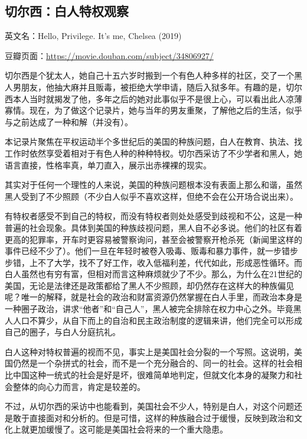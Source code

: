 \subsection{切尔西：白人特权观察}

英文名：Hello, Privilege. It's me, Chelsea (2019)

豆瓣页面：\url{https://movie.douban.com/subject/34806927/}

切尔西是个犹太人，她自己十五六岁时搬到一个有色人种多样的社区，交了一个黑人男朋友，他抽大麻并且贩毒，被拒绝大学申请，随后入狱多年。有趣的是，切尔西本人当时就揭发了他，多年之后的她对此事似乎不是很上心，可以看出此人凉薄寡情。现在，为了做这个记录片，她与当年的男友重聚，了解他之后的生活，似乎与之前达成了一种和解（并没有）。

本记录片聚焦在平权运动半个多世纪后的美国的种族问题，白人在教育、执法、找工作时依然享受着相对于有色人种的种种特权。切尔西采访了不少学者和黑人，她语言直接，性格率真，单刀直入，展示出赤裸裸的现实。

其实对于任何一个理性的人来说，美国的种族问题根本没有表面上那么和谐，虽然黑人受到了不少照顾（不少白人似乎不喜欢这样，但绝不会在公开场合说出来）。

有特权者感受不到自己的特权，而没有特权者则处处感受到歧视和不公，这是一种普遍的社会现象。具体到美国的种族歧视问题，黑人自不必多说。他们的社区有着更高的犯罪率，开车时更容易被警察询问，甚至会被警察开枪杀死（新闻里这样的事件已经不少了）。他们一旦在年轻时被卷入吸毒、贩毒和暴力事件，就一步错步步错，上不了大学，找不了好工作，收入低福利差，代代如此，形成恶性循环。而白人虽然也有穷有富，但相对而言这种麻烦就少了不少。那么，为什么在21世纪的美国，无论是法律还是政策都给了黑人不少照顾，却仍然存在这样大的种族偏见呢？唯一的解释，就是社会的政治和财富资源仍然掌握在白人手里，而政治本身是一种圈子政治，讲求“他者”和“自己人”，黑人被完全排除在权力中心之外。毕竟黑人人口不算少，从自下而上的自治和民主政治制度的逻辑来讲，他们完全可以形成自己的圈子，与白人分庭抗礼。

白人这种对特权普遍的视而不见，事实上是美国社会分裂的一个写照。这说明，美国仍然是一个杂拼式的社会，而不是一个充分融合的、同一的社会。这样的社会相比中国这种一统式的社会是好是坏，很难简单地判定，但就文化本身的凝聚力和社会整体的向心力而言，肯定是较差的。

不过，从切尔西的采访中也能看到，美国社会不少人，特别是白人，对这个问题还是敢于直接面对和分析的。但是可惜，这样的种族融合过于缓慢，反映到政治和文化上就更加缓慢了。这可能是美国社会将来的一个重大隐患。
